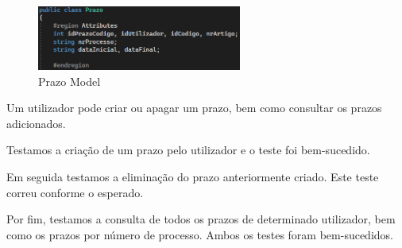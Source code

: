 \begin{figure}[!h]
\centering
\includegraphics[width=0.6\textwidth]{Figuras/Models/PrazoModel.png}
\caption{Prazo Model}
\label{d.model}
\end{figure}

\newpage

\indent \par Um utilizador pode criar ou apagar um prazo, bem como consultar os prazos adicionados.
\indent \par Testamos a criação de um prazo pelo utilizador e o teste foi bem-sucedido. 
\indent \par Em seguida testamos a eliminação do prazo anteriormente criado. Este teste correu conforme o esperado.
\indent \par Por fim, testamos a consulta de todos os prazos de determinado utilizador, bem como os prazos por número de processo. Ambos os testes foram bem-sucedidos.

